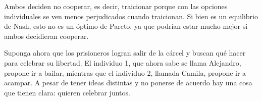 \documentclass{exam}
\begin{document}
\begin{enumerate}[label=(\alph*), ref=\alph*]
\begin{solution}
    \begin{center}

    
\end{center}

Ambos deciden no cooperar, es decir, traicionar porque con las opciones individuales se ven menos perjudicados cuando traicionan. Si bien es un equilibrio de Nash, esto no es un óptimo de Pareto, ya que podrían estar mucho mejor si ambos decidieran cooperar. 
    \end{solution}
  \end{enumerate}

Suponga ahora que los prisioneros logran salir de la cárcel y buscan qué hacer para celebrar su libertad. El individuo 1, que ahora sabe se llama Alejandro, propone ir a bailar, mientras que el individuo 2, llamada Camila, propone ir a acampar. A pesar de tener ideas distintas y no ponerse de acuerdo hay una cosa que tienen clara: quieren celebrar juntos.
\end{document}
